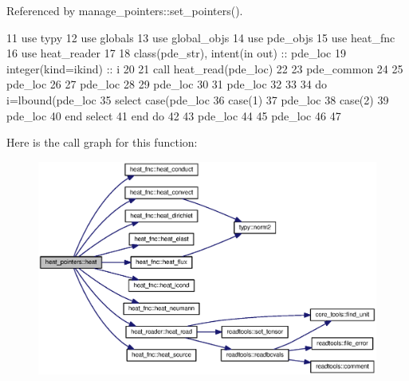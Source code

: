 Referenced by manage\+\_\+pointers\+::set\+\_\+pointers().


\begin{DoxyCode}
11       \textcolor{keywordtype}{use }typy
12       \textcolor{keywordtype}{use }globals
13       \textcolor{keywordtype}{use }global_objs
14       \textcolor{keywordtype}{use }pde_objs
15       \textcolor{keywordtype}{use }heat_fnc
16       \textcolor{keywordtype}{use }heat_reader
17       
18       \textcolor{keywordtype}{class}(pde_str), \textcolor{keywordtype}{intent(in out)} :: pde\_loc
19       \textcolor{keywordtype}{integer(kind=ikind)} :: i
20       
21       \textcolor{keyword}{call }heat_read(pde\_loc)
22       
23       pde_common%
24             
25       pde\_loc%
26       
27       pde\_loc%
28 
29       pde\_loc%
30             
31       pde\_loc%
32       
33           
34       \textcolor{keywordflow}{do} i=lbound(pde\_loc%
35         \textcolor{keywordflow}{select case}(pde\_loc%
36           \textcolor{keywordflow}{case}(1)
37             pde\_loc%
38           \textcolor{keywordflow}{case}(2)
39             pde\_loc%
40 \textcolor{keywordflow}{        end select}
41 \textcolor{keywordflow}{      end do}    
42         
43       pde\_loc%
44       
45       pde\_loc%
46       
47     
\end{DoxyCode}


Here is the call graph for this function\+:\nopagebreak
\begin{figure}[H]
\begin{center}
\leavevmode
\includegraphics[width=350pt]{namespaceheat__pointers_a722171d0f13e6c6c18092dfdbca69220_cgraph}
\end{center}
\end{figure}




